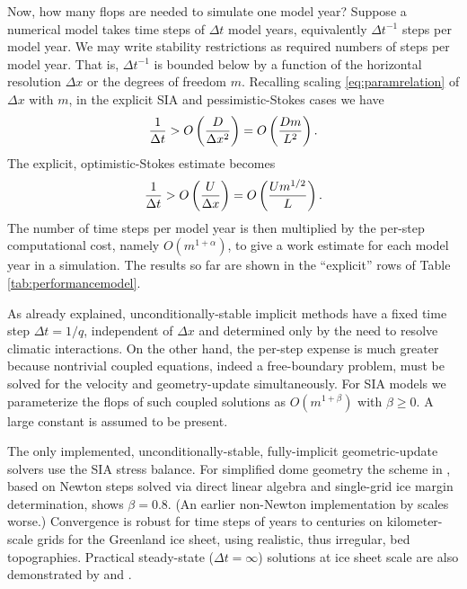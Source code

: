 \documentclass[review,letterpaper]{igs}
\begin{document}
Now, how many flops are needed to simulate one model year?  Suppose a numerical model takes time steps of $\Delta t$ model years, equivalently $\Delta t^{-1}$ steps per model year.  We may write stability restrictions as required numbers of steps per model year.  That is, $\Delta t^{-1}$ is bounded below by a function of the horizontal resolution $\Delta x$ or the degrees of freedom $m$.  Recalling scaling \eqref{eq:paramrelation} of $\Delta x$ with $m$, in the explicit SIA and pessimistic-Stokes cases we have
\begin{equation}
\frac{1}{\Delta t} > \displaystyle O\left(\frac{D}{\Delta x^2}\right) = \displaystyle O\left(\frac{D m}{L^2}\right). \label{eq:explicitsiarequired}
\end{equation}
The explicit, optimistic-Stokes estimate becomes
\begin{equation}
\frac{1}{\Delta t} > \displaystyle O\left(\frac{U}{\Delta x}\right) = \displaystyle O\left(\frac{U m^{1/2}}{L}\right). \label{eq:explicitoptstokesrequired}
\end{equation}
The number of time steps per model year is then multiplied by the per-step computational cost, namely $O(m^{1+\alpha})$, to give a work estimate for each model year in a simulation.  The results so far are shown in the ``explicit'' rows of Table \ref{tab:performancemodel}.

As already explained, unconditionally-stable implicit methods have a fixed time step $\Delta t = 1/q$, independent of $\Delta x$ and determined only by the need to resolve climatic interactions.  On the other hand, the per-step expense is much greater because nontrivial coupled equations, indeed a free-boundary problem, must be solved for the velocity and geometry-update simultaneously.  For SIA models we parameterize the flops of such coupled solutions as $O(m^{1+\beta})$ with $\beta \ge 0$.  A large constant is assumed to be present.


The only implemented, unconditionally-stable, fully-implicit geometric-update solvers use the SIA stress balance.  For simplified dome geometry the scheme in \cite{Bueler2016}, based on Newton steps solved via direct linear algebra and single-grid ice margin determination, shows $\beta=0.8$.  (An earlier non-Newton implementation by \cite{JouvetBueler2012} scales worse.)  Convergence is robust for time steps of years to centuries on kilometer-scale grids for the Greenland ice sheet, using realistic, thus irregular, bed topographies.  Practical steady-state ($\Delta t=\infty$) solutions at ice sheet scale are also demonstrated by \cite{JouvetBueler2012} and \cite{Bueler2016}.
\end{document}
